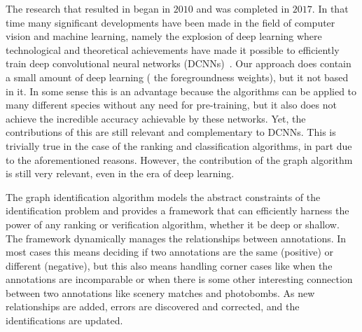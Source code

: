     The research that resulted in \thesis{} began in $2010$ and was completed in $2017$.
    In that time many significant developments have been made in the field of computer vision and machine
      learning, namely the explosion of deep learning where technological and theoretical achievements have made it
      possible to efficiently train deep convolutional neural networks (DCNNs)~\cite{lecun_deep_2015}.
    Our approach does contain a small amount of deep learning (\eg{} the foregroundness weights), but it not
      based in it.
    In some sense this is an advantage because the algorithms can be applied to many different species without
      any need for pre-training, but it also does not achieve the incredible accuracy achievable by these networks.
    Yet, the contributions of this \thesis{} are still relevant and complementary to DCNNs.
    This is trivially true in the case of the ranking and classification algorithms, in part due to the
      aforementioned reasons.
    However, the contribution of the graph algorithm is still very relevant, even in the era of deep learning.
    
    The graph identification algorithm models the abstract constraints of the identification problem and provides
      a framework that can efficiently harness the power of any ranking or verification algorithm, whether it be
      deep or shallow.
    The framework dynamically manages the relationships between annotations.
    In most cases this means deciding if two annotations are the same (positive) or different (negative), but
      this also means handling corner cases like when the annotations are incomparable or when there is some other
      interesting connection between two annotations like scenery matches and photobombs.
    As new relationships are added, errors are discovered and corrected, and the identifications are updated.

